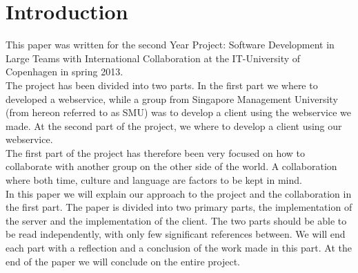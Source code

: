 \section{Introduction}
This paper was written for the second Year Project: Software Development in Large Teams with International Collaboration at the IT-University of Copenhagen in spring 2013.\\

The project has been divided into two parts. In the first part we where to developed a webservice, while a group from Singapore Management University (from hereon referred to as SMU) was to develop a client using the webservice we made. At the second part of the project, we where to develop a client using our webservice.\\

The first part of the project has therefore been very focused on how to collaborate with another group on the other side of the world. A collaboration where both time, culture and language are factors to be kept in mind.\\

In this paper we will explain our approach to the project and the collaboration in the first part.
The paper is divided into two primary parts, the implementation of the server and the implementation of the client.
The two parts should be able to be read independently, with only few significant references between. We will end each part with a reflection and a conclusion of the work made in this part.
At the end of the paper we will conclude on the entire project.
\newpage